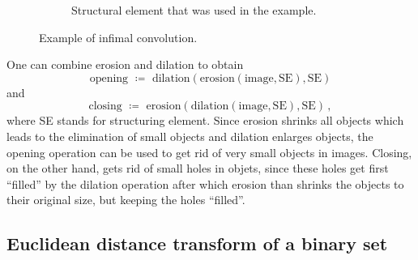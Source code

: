 \begin{figure}[htpb]
\begin{subfigure}[b]{0.3\textwidth}
    \caption{Structural element that was used in the example.}
  \end{subfigure}%
  \label{fig:tropconv}%
  \caption{Example of infimal convolution.}%
\end{figure}
 One can
combine erosion and dilation to obtain
\begin{equation*}
  \text{opening } \coloneqq \text{ dilation}(\text{erosion}(\text{image},\text{SE}),\text{SE}) 
\end{equation*}
and
\begin{equation*}
  \text{closing } \coloneqq \text{ erosion}(\text{dilation}(\text{image},\text{SE}),\text{SE})\,,
\end{equation*}
where SE stands for structuring element. Since erosion shrinks all
objects which leads to the elimination of small objects and dilation
enlarges objects, the opening operation can be used to get rid of very
small objects in images. Closing, on the other hand, gets rid of small
holes in objets, since these holes get first ``filled'' by the
dilation operation after which erosion than shrinks the objects to
their original size, but keeping the holes ``filled''.

\subsection*{Euclidean distance transform of a binary set}

